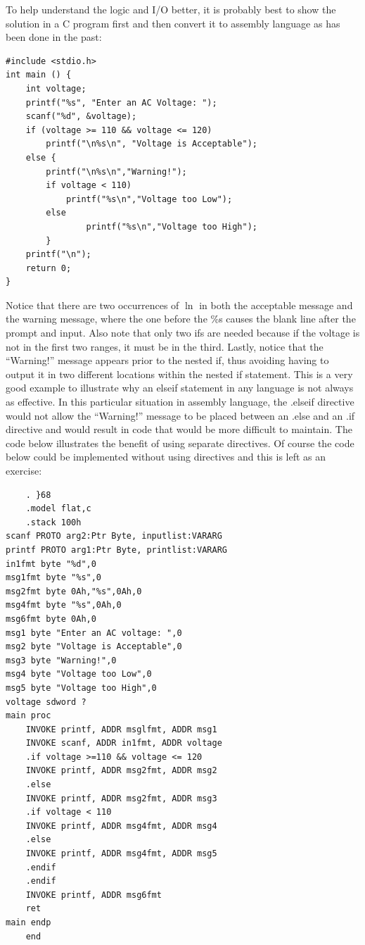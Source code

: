 \documentclass[10pt]{book}
\begin{document}
To help understand the logic and I/O better, it is probably best to show the solution in a C program first and then convert it to assembly language as has been done in the past:

\begin{verbatim}
#include <stdio.h>
int main () {
    int voltage;
    printf("%s", "Enter an AC Voltage: ");
    scanf("%d", &voltage);
    if (voltage >= 110 && voltage <= 120)
        printf("\n%s\n", "Voltage is Acceptable");
    else {
        printf("\n%s\n","Warning!");
        if voltage < 110)
            printf("%s\n","Voltage too Low");
        else
                printf("%s\n","Voltage too High");
        }
    printf("\n");
    return 0;
}
\end{verbatim}

Notice that there are two occurrences of $\ln$ in both the acceptable message and the warning message, where the one before the \%s causes the blank line after the prompt and input. Also note that only two ifs are needed because if the voltage is not in the first two ranges, it must be in the third. Lastly, notice that the ``Warning!'' message appears prior to the nested if, thus avoiding having to output it in two different locations within the nested if statement. This is a very good example to illustrate why an elseif statement in any language is not always as effective. In this particular situation in assembly language, the .elseif directive would not allow the ``Warning!'' message to be placed between an .else and an .if directive and would result in code that would be more difficult to maintain. The code below illustrates the benefit of using separate directives. Of course the code below could be implemented without using directives and this is left as an exercise:

\begin{verbatim}
    . }68
    .model flat,c
    .stack 100h
scanf PROTO arg2:Ptr Byte, inputlist:VARARG
printf PROTO arg1:Ptr Byte, printlist:VARARG
in1fmt byte "%d",0
msg1fmt byte "%s",0
msg2fmt byte 0Ah,"%s",0Ah,0
msg4fmt byte "%s",0Ah,0
msg6fmt byte 0Ah,0
msg1 byte "Enter an AC voltage: ",0
msg2 byte "Voltage is Acceptable",0
msg3 byte "Warning!",0
msg4 byte "Voltage too Low",0
msg5 byte "Voltage too High",0
voltage sdword ?
main proc
    INVOKE printf, ADDR msglfmt, ADDR msg1
    INVOKE scanf, ADDR in1fmt, ADDR voltage
    .if voltage >=110 && voltage <= 120
    INVOKE printf, ADDR msg2fmt, ADDR msg2
    .else
    INVOKE printf, ADDR msg2fmt, ADDR msg3
    .if voltage < 110
    INVOKE printf, ADDR msg4fmt, ADDR msg4
    .else
    INVOKE printf, ADDR msg4fmt, ADDR msg5
    .endif
    .endif
    INVOKE printf, ADDR msg6fmt
    ret
main endp
    end
\end{verbatim}
\end{document}
